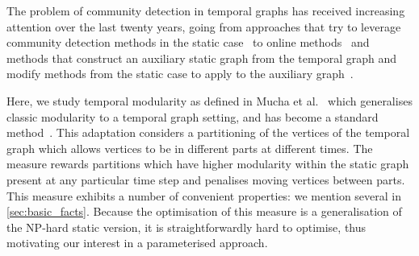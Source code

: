 \documentclass[runningheads]{llncs}
\begin{document}


The problem of community detection in temporal graphs has received increasing attention over the last twenty years, going from approaches that try to leverage community detection methods in the static case~\cite{Greene_Doyle_Cunningham_2010,Hopcroft_Khan_Kulis_Selman_2004,Palla_Barabási_Vicsek_2007,Rosvall_Bergstrom_2010,Sun_Faloutsos_Papadimitriou_Yu_2007} to online methods~\cite{Aynaud_Guillaume_2010,Folino_Pizzuti_2014,Lin_Chi_Zhu_Sundaram_Tseng_2008,Seifikar_Farzi_Barati_2020,Yuan_Zhang_Ke_Lu_Li_Liu_2025} and methods that construct an auxiliary static graph from the temporal graph and modify methods from the static case to apply to the auxiliary graph~\cite{Bassett_Porter_Wymbs_Grafton_Carlson_Mucha_2013,DiTursi_Ghosh_Bogdanov_2017,jian2023restrictedtweediestochasticblock,mucha2010community,paoletti2024benchmarkingevolutionarycommunitydetection,zhang2024fast}.


Here, we study temporal modularity as defined in Mucha et al.~\cite{mucha2010community} which generalises %
classic modularity %
to a temporal graph setting, and has become a standard method~\cite{Bianconi_2018,magnani2021analysis,Mueller_Pritschet_Santander_Taylor_Grafton_Jacobs_Carlson_2021,nicosia2013graph}.  This adaptation considers a partitioning of the vertices of the temporal graph which allows vertices to be in different parts at different times. The measure rewards partitions which have higher modularity within the static graph present at any particular time step and penalises moving vertices between parts. %
This measure exhibits a number of convenient properties: we mention several in \cref{sec:basic_facts}. Because the optimisation of this measure is a generalisation of the NP-hard static version, it is straightforwardly hard to optimise, thus motivating our interest in a parameterised approach. 
\end{document}
